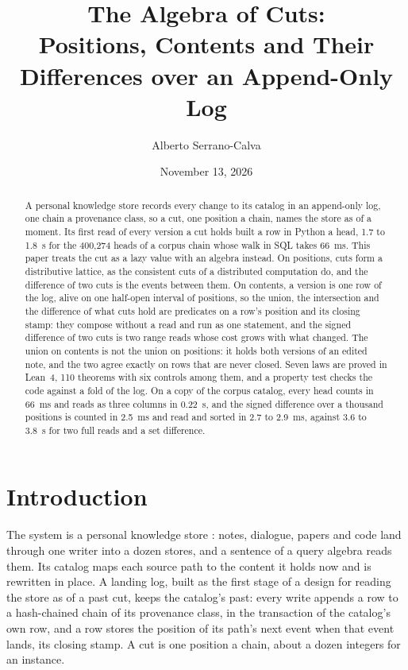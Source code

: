 \documentclass[11pt]{article}
\title{The Algebra of Cuts:\\
Positions, Contents and Their Differences over an Append-Only Log}
\author{Alberto Serrano-Calva}
\date{November 13, 2026}
\theoremstyle{plain}
\theoremstyle{definition}
\begin{document}
\maketitle

\begin{abstract}
A personal knowledge store records every change to its catalog in an append-only log, one chain a
provenance class, so a cut, one position a chain, names the store as of a moment. Its first read
of every version a cut holds built a row in Python a head, 1.7 to 1.8~s for the 400{,}274 heads
of a corpus chain whose walk in SQL takes 66~ms. This paper treats the cut as a lazy value with an
algebra instead. On positions, cuts form a distributive lattice, as the consistent cuts of a
distributed computation do, and the difference of two cuts is the events between them. On
contents, a version is one row of the log, alive on one half-open interval of positions, so the
union, the intersection and the difference of what cuts hold are predicates on a row's position
and its closing stamp: they compose without a read and run as one statement, and the signed
difference of two cuts is two range reads whose cost grows with what changed. The union on
contents is not the union on positions: it holds both versions of an edited note, and the two
agree exactly on rows that are never closed. Seven laws are proved in Lean~4, 110 theorems with
six controls among them, and a property test checks the code against a fold of the log. On a
copy of the corpus catalog, every head counts in 66~ms and reads as three columns in 0.22~s, and
the signed difference over a thousand positions is counted in 2.5~ms and read and sorted in 2.7
to 2.9~ms, against 3.6 to 3.8~s for two full reads and a set difference.
\end{abstract}

\section{Introduction}

The system is a personal knowledge store \cite{serranocalva2026palace}: notes, dialogue, papers and
code land through one writer into a dozen stores, and a sentence of a query algebra reads them.
Its catalog maps each source path to the content it holds now and is rewritten in place. A
landing log, built as the first stage of a design for reading the store as of a past cut, keeps
the catalog's past: every write appends a row to a hash-chained chain of its provenance class, in
the transaction of the catalog's own row, and a row stores the position of its path's next event
when that event lands, its closing stamp. A cut is one position a chain, about a dozen integers
for an instance.
\end{document}
